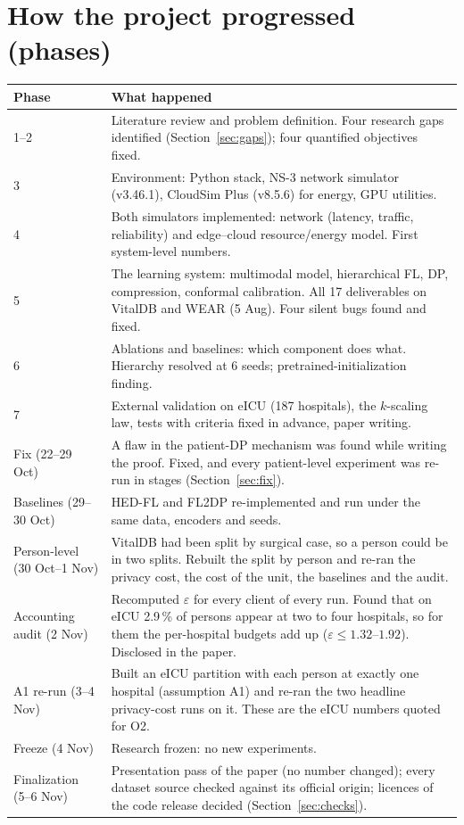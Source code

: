 \documentclass[11pt,a4paper]{article}
\begin{document}
\section{How the project progressed (phases)}

\begin{center}
\small
\begin{tabular}{l P{0.72\textwidth}}
\toprule
Phase & What happened \\
--2 & Literature review and problem definition. Four research gaps identified
(Section~\ref{sec:gaps}); four quantified objectives fixed. \\
3 & Environment: Python stack, NS-3 network simulator (v3.46.1), CloudSim Plus
(v8.5.6) for energy, GPU utilities. \\
4 & Both simulators implemented: network (latency, traffic, reliability) and
edge--cloud resource/energy model. First system-level numbers. \\
5 & The learning system: multimodal model, hierarchical FL, DP, compression,
conformal calibration. All 17 deliverables on VitalDB and WEAR (5 Aug).
Four silent bugs found and fixed. \\
6 & Ablations and baselines: which component does what. Hierarchy
resolved at 6 seeds; pretrained-initialization finding. \\
7 & External validation on eICU (187 hospitals), the $k$-scaling law,
tests with criteria fixed in advance, paper writing. \\
Fix (22--29 Oct) & A flaw in the patient-DP mechanism was found while writing the
proof. Fixed, and every patient-level experiment was re-run in stages
(Section~\ref{sec:fix}). \\
Baselines (29--30 Oct) & HED-FL and FL2DP re-implemented and run under the
same data, encoders and seeds. \\
Person-level (30 Oct--1 Nov) & VitalDB had been split by surgical case, so a
person could be in two splits. Rebuilt the split by person and re-ran the
privacy cost, the cost of the unit, the baselines and the audit. \\
Accounting audit (2 Nov) & Recomputed $\varepsilon$ for every client of every run.
Found that on eICU 2.9\,\% of persons appear at two to four hospitals, so for them
the per-hospital budgets add up ($\varepsilon \le 1.32$--$1.92$). Disclosed in the paper. \\
A1 re-run (3--4 Nov) & Built an eICU partition with each person at exactly one
hospital (assumption A1) and re-ran the two headline privacy-cost runs on it.
These are the eICU numbers quoted for O2. \\
Freeze (4 Nov) & Research frozen: no new experiments. \\
Finalization (5--6 Nov) & Presentation pass of the paper (no number changed);
every dataset source checked against its official origin; licences of the code
release decided (Section~\ref{sec:checks}). \\
\bottomrule
\end{tabular}
\end{center}
\end{document}

